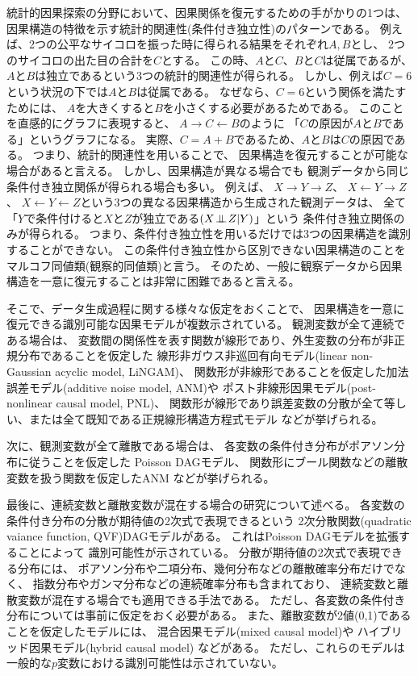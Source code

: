 統計的因果探索の分野において、因果関係を復元するための手がかりの1つは、
因果構造の特徴を示す統計的関連性(条件付き独立性)のパターンである\cite{Pearl2009-oh}。
例えば、2つの公平なサイコロを振った時に得られる結果をそれぞれ$A, B$とし、
2つのサイコロの出た目の合計を$C$とする。
この時、$A$と$C$、$B$と$C$は従属であるが、
$A$と$B$は独立であるという3つの統計的関連性が得られる。
しかし、例えば$C=6$という状況の下では$A$と$B$は従属である。
なぜなら、$C=6$という関係を満たすためには、
$A$を大きくすると$B$を小さくする必要があるためである。
このことを直感的にグラフに表現すると、
$A \rightarrow C \leftarrow B$のように
「$C$の原因が$A$と$B$である」というグラフになる。
実際、$C=A+B$であるため、$A$と$B$は$C$の原因である。
つまり、統計的関連性を用いることで、
因果構造を復元することが可能な場合があると言える。
しかし、因果構造が異なる場合でも
観測データから同じ条件付き独立関係が得られる場合も多い。
例えば、
$X \rightarrow Y \rightarrow Z$、
$X \leftarrow Y \rightarrow Z$、
$X \leftarrow Y \leftarrow Z$という3つの異なる因果構造から生成された観測データは、
全て「$Y$で条件付けると$X$と$Z$が独立である$(X \mathop{\,\perp\!\!\!\!\!\!\perp\,} Z | Y)$」という
条件付き独立関係のみが得られる。
つまり、条件付き独立性を用いるだけでは3つの因果構造を識別することができない。
この条件付き独立性から区別できない因果構造のことをマルコフ同値類(観察的同値類)と言う\cite{Pearl2009-oh}。
そのため、一般に観察データから因果構造を一意に復元することは非常に困難であると言える。

そこで、データ生成過程に関する様々な仮定をおくことで、
因果構造を一意に復元できる識別可能な因果モデルが複数示されている。
観測変数が全て連続である場合は、
変数間の関係性を表す関数が線形であり、外生変数の分布が非正規分布であることを仮定した
線形非ガウス非巡回有向モデル(linear non-Gaussian acyclic model, LiNGAM)\cite{Shimizu2006-yu}、
関数形が非線形であることを仮定した加法誤差モデル(additive noise model, ANM)\cite{Hoyer2008-oo}や
ポスト非線形因果モデル(post-nonlinear causal model, PNL)\cite{Zhang2012-ay}、
関数形が線形であり誤差変数の分散が全て等しい、または全て既知である正規線形構造方程式モデル\cite{Peters2013-eb}
などが挙げられる。

次に、観測変数が全て離散である場合は、
各変数の条件付き分布がポアソン分布に従うことを仮定した
Poisson DAGモデル\cite{Park2015-tj}、
関数形にブール関数などの離散変数を扱う関数を仮定したANM\cite{Peters2011-ew}
などが挙げられる。

最後に、連続変数と離散変数が混在する場合の研究について述べる。
各変数の条件付き分布の分散が期待値の2次式で表現できるという
2次分散関数(quadratic vaiance function, QVF)DAGモデル\cite{Park2017-hw}がある。
これはPoisson DAGモデル\cite{Park2015-tj}を拡張することによって
識別可能性が示されている。
分散が期待値の2次式で表現できる分布には、
ポアソン分布や二項分布、幾何分布などの離散確率分布だけでなく、
指数分布やガンマ分布などの連続確率分布も含まれており、
連続変数と離散変数が混在する場合でも適用できる手法である。
ただし、各変数の条件付き分布については事前に仮定をおく必要がある。
また、離散変数が2値(0,1)であることを仮定したモデルには、
混合因果モデル(mixed causal model)\cite{Wenjuan2018-nm}や
ハイブリッド因果モデル(hybrid causal model)\cite{Li2018-aw}
などがある。
ただし、これらのモデルは一般的な$p$変数における識別可能性は示されていない。
